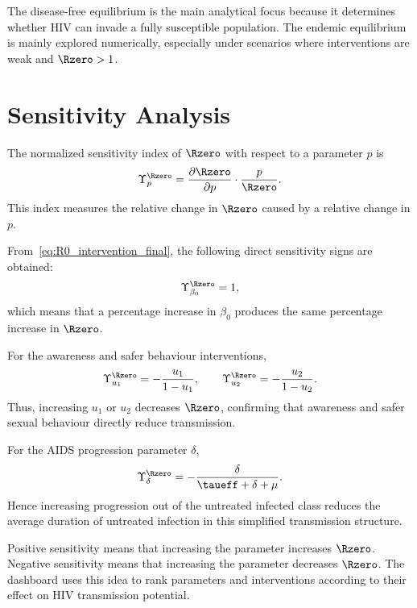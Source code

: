 \begin{remarkbox}[title={Interpretation}]
The disease-free equilibrium is the main analytical focus because it determines whether HIV can invade a fully susceptible population. The endemic equilibrium is mainly explored numerically, especially under scenarios where interventions are weak and $\Rzero>1$.
\end{remarkbox}

\section{Sensitivity Analysis}

The normalized sensitivity index of $\Rzero$ with respect to a parameter $p$ is
\begin{equation}
\Upsilon_p^{\Rzero}
=
\frac{\partial \Rzero}{\partial p}\cdot\frac{p}{\Rzero}.
\label{eq:sensitivity_index}
\end{equation}
This index measures the relative change in $\Rzero$ caused by a relative change in $p$.

From~\eqref{eq:R0_intervention_final}, the following direct sensitivity signs are obtained:
\[
\Upsilon_{\beta_0}^{\Rzero}=1,
\]
which means that a percentage increase in $\beta_0$ produces the same percentage increase in $\Rzero$.

For the awareness and safer behaviour interventions,
\[
\Upsilon_{u_1}^{\Rzero}=-\frac{u_1}{1-u_1},
\qquad
\Upsilon_{u_2}^{\Rzero}=-\frac{u_2}{1-u_2}.
\]
Thus, increasing $u_1$ or $u_2$ decreases $\Rzero$, confirming that awareness and safer sexual behaviour directly reduce transmission.

For the AIDS progression parameter $\delta$,
\[
\Upsilon_{\delta}^{\Rzero}
=
-\frac{\delta}{\taueff+\delta+\mu}.
\]
Hence increasing progression out of the untreated infected class reduces the average duration of untreated infection in this simplified transmission structure.

\begin{remarkbox}[title={Sensitivity interpretation}]
Positive sensitivity means that increasing the parameter increases $\Rzero$. Negative sensitivity means that increasing the parameter decreases $\Rzero$. The dashboard uses this idea to rank parameters and interventions according to their effect on HIV transmission potential.
\end{remarkbox}

